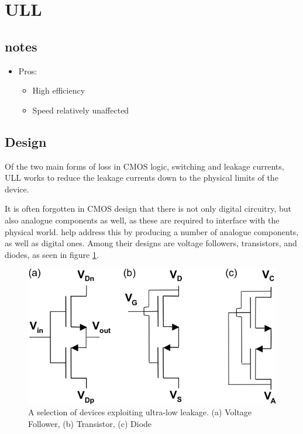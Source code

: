 \section{\acf{ULL}}
\label{sec:ull}

\subsection{notes}

\nocite{*}
\begin{itemize}

\item Pros:

\begin{itemize}

\item High efficiency
\item Speed relatively unaffected

\end{itemize}

\end{itemize}

\subsection{Design}

Of the two main forms of loss in CMOS logic, switching and leakage currents, \ac{ULL} works to reduce the leakage currents down to the physical limits of the device.

It is often forgotten in CMOS design that there is not only digital circuitry, but also analogue components as well, as these are required to interface with the physical world.
\citeauthor{ULL-AandD} help address this by producing a number of analogue components, as well as digital ones.
Among their designs are voltage followers, transistors, and diodes, as seen in figure \ref{fig:ulldevices}.

\begin{figure}
	\centering
	\includegraphics[width=\columnwidth]{../../images/ULLdevices.png}
	\caption{A selection of devices exploiting ultra-low leakage. (a) Voltage Follower, (b) Transistor, (c) Diode \cite{DisruptiveULL}}
	\label{fig:ulldevices}
\end{figure}


